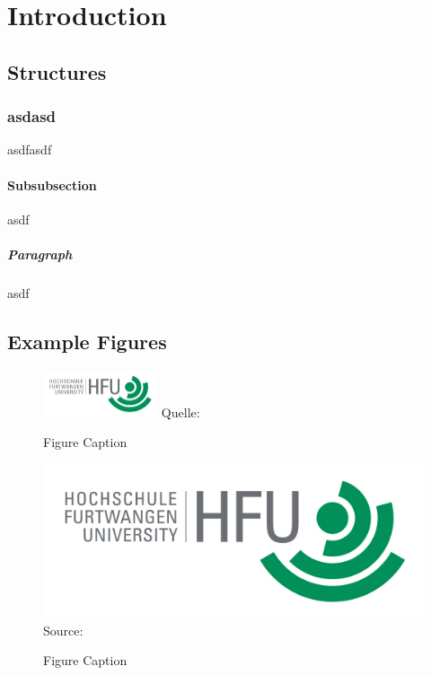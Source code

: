 \chapter{Introduction}

\section{Structures}

\subsection{asdasd}
asdfasdf

\subsubsection{Subsubsection}
asdf

\paragraph{Paragraph}
asdf

\section{Example Figures}

\lipsum[10]

\begin{figure}
\caption{Figure Caption}
\centering
\includegraphics[width=0.3\textwidth]{content/pictures/hfu}
Quelle: \cite{s11wasml}
\label{pic:bild2}
\end{figure}

\lipsum[10]

\begin{figure}
\caption{Figure Caption}
\includegraphics[width=1\textwidth]{content/pictures/hfu}
Source: \cite{s11wasml}
\label{pic:bild1}
\end{figure}

